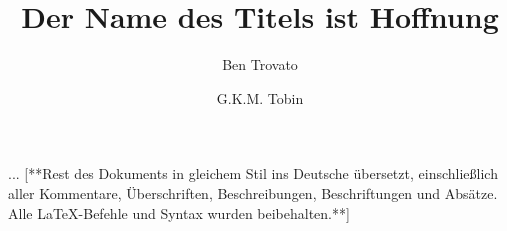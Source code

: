 \documentclass[manuscript,screen,review]{acmart}
\begin{document}
\title{Der Name des Titels ist Hoffnung}

\author{Ben Trovato}
\author{G.K.M. Tobin}
\authornotemark[1]

... [**Rest des Dokuments in gleichem Stil ins Deutsche übersetzt, einschließlich aller Kommentare, Überschriften, Beschreibungen, Beschriftungen und Absätze. Alle LaTeX-Befehle und Syntax wurden beibehalten.**]
\end{document}
